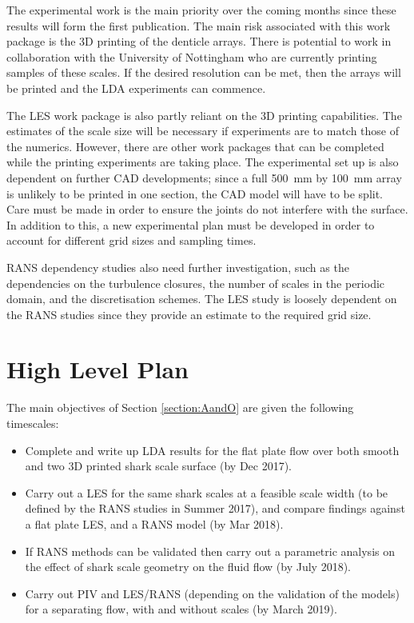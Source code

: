 \documentclass[12pt,oneside,a4paper]{article}
\begin{document}
%
 The experimental work is the main priority over the coming months since these results will form the first publication. The main risk associated with this work package is the 3D printing of the denticle arrays. There is potential to work in collaboration with the University of Nottingham who are currently printing samples of these scales. If the desired resolution can be met, then the arrays will be printed and the LDA experiments can commence. 

The LES work package is also partly reliant on the 3D printing capabilities. The estimates of the scale size will be necessary if experiments are to match those of the numerics. However, there are other work packages that can be completed while the printing experiments are taking place. The experimental set up is also dependent on further CAD developments; since a full \SI{500}{mm} by \SI{100}{mm} array is unlikely to be printed in one section, the CAD model will have to be split. Care must be made in order to ensure the joints do not interfere with the surface. In addition to this, a new experimental plan must be developed in order to account for different grid sizes and sampling times.

RANS dependency studies also need further investigation, such as the dependencies on the turbulence closures, the number of scales in the periodic domain, and the discretisation schemes. The LES study is loosely dependent on the RANS studies since they provide an estimate to the required grid size. 

\section{High Level Plan}
The main objectives of Section \ref{section:AandO} are given the following timescales:

\begin{itemize}
\itemsep0em
\item	Complete and write up LDA results for the flat plate flow over both smooth and two 3D printed shark scale surface (by Dec 2017).

\item  Carry out a LES for the same shark scales at a feasible scale width (to be defined by the RANS studies in Summer 2017), and compare findings against a flat plate LES, and a RANS model (by Mar 2018).

\item	 If RANS methods can be validated then carry out a parametric analysis on the effect of shark scale geometry on the fluid flow (by July 2018).

\item	Carry out PIV and LES/RANS (depending on the validation of the models) for a separating flow, with and without scales (by March 2019).
\end{itemize}
\noindent
\end{document}
